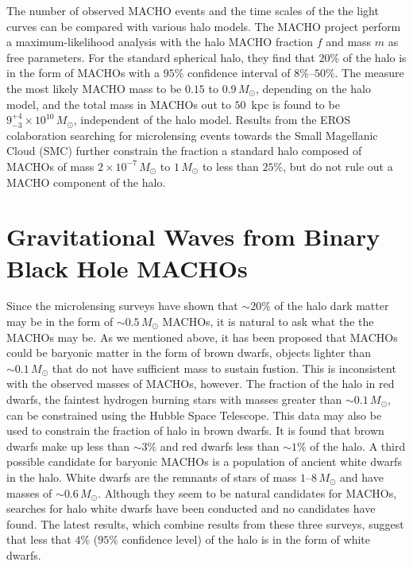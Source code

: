 The number of observed MACHO events and the time scales of the the light
curves can be compared with various halo models. The MACHO project perform a
maximum-likelihood analysis with the halo MACHO fraction $f$ and mass $m$ as
free parameters. For the standard spherical halo, they find that $20\%$ of the
halo is in the form of MACHOs with a $95\%$ confidence interval of
$8\%$--$50\%$. The measure the most likely MACHO mass to be $0.15$ to
$0.9\,M_\odot$, depending on the halo model, and the total mass in MACHOs out
to $50$~kpc is found to be $9_{-3}^{+4} \times 10^{10}\,M_\odot$, independent
of the halo model\cite{Alcock:2000ph}. Results from the EROS
colaboration\cite{Afonso:2002xq} searching for microlensing events towards the
Small Magellanic Cloud (SMC) further constrain the fraction a standard halo
composed of MACHOs of mass $2 \times 10^{-7}\,M_\odot$ to $1\, M_\odot$ to
less than $25\%$, but do not rule out a MACHO component of the halo.

\section{Gravitational Waves from Binary Black Hole MACHOs}
\label{s:bbhmacho}

Since the microlensing surveys have shown that $\sim 20\%$ of the halo dark
matter may be in the form of $\sim 0.5\,M_\odot$ MACHOs, it is natural to ask
what the the MACHOs may be. As we mentioned above, it has been proposed that
MACHOs could be baryonic matter in the form of brown dwarfs, objects lighter
than $\sim 0.1\,M_\odot$ that do not have sufficient mass to sustain fustion.
This is inconsistent with the observed masses of MACHOs, however. The fraction
of the halo in red dwarfs, the faintest hydrogen burning stars with masses
greater than $\sim 0.1\,M_\odot$, can be constrained using the Hubble Space
Telescope. This data may also be used to constrain the fraction of halo in
brown dwarfs. It is found that brown dwarfs make up less than $\sim 3\%$ and
red dwarfs less than $\sim 1\%$ of the halo\cite{Graff:1995ru,Graff:1996rz}.
A third possible candidate for baryonic MACHOs is a population of ancient
white dwarfs in the halo. White dwarfs are the remnants of stars of mass
$1$--$8\,M_\odot$ and have masses of $\sim 0.6\,M_\odot$. Although they seem
to be natural candidates for MACHOs, searches for halo white dwarfs have been
conducted and no candidates have
found\cite{2002A&A...389L..69G,2002ApJ...573..644N,Creze:2004gs}. The latest
results, which combine results from these three surveys, suggest that less
that $4\%$ ($95\%$ confidence level) of the halo is in the form of white
dwarfs\cite{Creze:2004gs}. 

